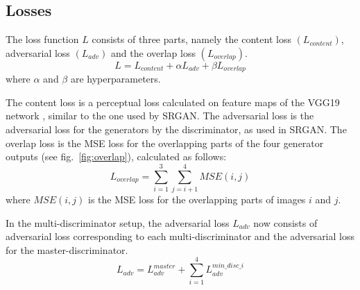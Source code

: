 \documentclass[12pt,a4paper]{article}
\begin{document}
\begin{multicols}{2}
        \section{Losses}
            The loss function $L$ consists of three parts, namely the content loss $(L_{content})$, adversarial loss $(L_{adv})$ and the overlap loss $(L_{overlap})$.
                $$L = L_{content} + \alpha L_{adv} + \beta L_{overlap}$$
            where $\alpha$ and $\beta$ are hyperparameters.

            The content loss is a perceptual loss \cite{perceptual} calculated on feature maps of the VGG19 network \cite{vgg}, similar to the one used by SRGAN.
            The adversarial loss is the adversarial loss for the generators by the discriminator, as used in SRGAN.
            The overlap loss is the MSE loss for the overlapping parts of the four generator outputs (see fig.~\ref{fig:overlap}), calculated as follows:
                $$L_{overlap} = \sum_{i=1}^3 \sum_{j=i+1}^4 MSE(i, j)$$
            where $MSE(i, j)$ is the MSE loss for the overlapping parts of images $i$ and $j$.

            In the multi-discriminator setup, the adversarial loss $L_{adv}$ now consists of adversarial loss corresponding to each multi-discriminator and the adversarial loss for the master-discriminator.
                $$L_{adv} = L_{adv}^{master} + \sum_{i=1}^{4}L_{adv}^{min\_disc\_i}$$


\end{multicols}
\end{document}
